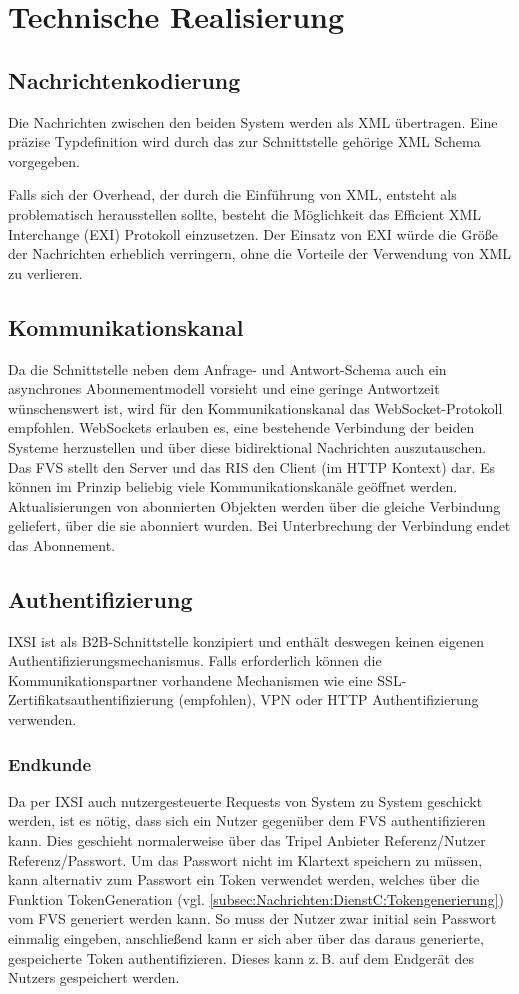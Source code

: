 \chapter{Technische Realisierung}
\label{sec:TechnischeRealisierung}


\section{Nachrichtenkodierung}
Die Nachrichten zwischen den beiden System werden als XML übertragen. Eine präzise Typdefinition wird durch das zur Schnittstelle gehörige XML Schema vorgegeben.

Falls sich der Overhead, der durch die Einführung von XML, entsteht als problematisch herausstellen sollte, besteht die Möglichkeit das Efficient XML Interchange (EXI) Protokoll einzusetzen. Der Einsatz von EXI würde die Größe der Nachrichten erheblich verringern, ohne die Vorteile der Verwendung von XML zu verlieren.

\section{Kommunikationskanal}
Da die Schnittstelle neben dem Anfrage- und Antwort-Schema auch ein asynchrones Abonnementmodell vorsieht und eine geringe Antwortzeit wünschenswert ist, wird für den Kommunikationskanal das WebSocket-Protokoll empfohlen. WebSockets erlauben es, eine bestehende Verbindung der beiden Systeme herzustellen und über diese bidirektional Nachrichten auszutauschen. Das FVS stellt den Server und das RIS den Client (im HTTP Kontext) dar. Es können im Prinzip beliebig viele Kommunikationskanäle geöffnet werden. Aktualisierungen von abonnierten Objekten werden über die gleiche Verbindung geliefert, über die sie abonniert wurden. Bei Unterbrechung der Verbindung endet das Abonnement.

\section{Authentifizierung}
IXSI ist als B2B-Schnittstelle konzipiert und enthält deswegen keinen eigenen Authentifizierungsmechanismus. Falls erforderlich können die Kommunikationspartner vorhandene Mechanismen wie eine SSL-Zertifikatsauthentifizierung (empfohlen), VPN oder HTTP Authentifizierung verwenden.

\subsection*{Endkunde}
Da per IXSI auch nutzergesteuerte Requests von System zu System geschickt werden, ist
es nötig, dass sich ein Nutzer gegenüber dem FVS authentifizieren kann.
Dies geschieht normalerweise über das Tripel Anbieter Referenz/Nutzer Referenz/Passwort. Um das  Passwort nicht im Klartext speichern zu müssen, kann alternativ zum Passwort ein Token
verwendet werden, welches über die Funktion TokenGeneration (vgl. \cref{subsec:Nachrichten:DienstC:Tokengenerierung}) vom FVS
generiert werden kann. So muss der Nutzer zwar initial sein Passwort einmalig eingeben, anschließend kann er sich aber über das daraus generierte, gespeicherte Token
authentifizieren. Dieses kann z.\,B. auf dem Endgerät des Nutzers gespeichert werden.

